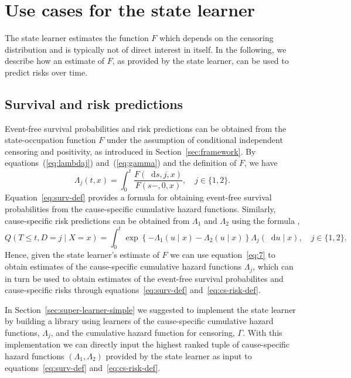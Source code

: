 \documentclass[a4paper,danish]{article}
\theoremstyle{plain} %
\numberwithin{theorem}{section}
\theoremstyle{definition} %
\theoremstyle{remark}
\newcommand*\diff{\mathop{}\!\mathrm{d}}
\newcommand{\1}{\mathds{1}}
\begin{document}
\section{Use cases for the state learner}
\label{sec:use-cases-state}
The state learner estimates the function \( F \) which depends on the
censoring distribution and is typically not of direct interest in
itself. In the following, we describe how an estimate of \( F \), as
provided by the state learner, can be used to predict risks over time.

\subsection{Survival and risk predictions}
\label{sec:surv-risk-pred}

Event-free survival probabilities and risk predictions can be
obtained from the state-occupation function \( F \) under the
assumption of conditional independent censoring and
positivity, as introduced in Section~\ref{sec:framework}. By
equations~(\ref{eq:lambdaj}) and~(\ref{eq:gamma}) and the
definition of \( F \), we have
\begin{equation}
  \label{eq:7}
  \Lambda_j(t , x) 
  = \int_0^t  \frac{F(\diff s, j, x )}{F(s-, 0, x )},
  \quad j \in \{1,2\}.
\end{equation}
Equation~\eqref{eq:surv-def} provides a formula for obtaining
event-free survival probabilities from the cause-specific
cumulative hazard functions. Similarly, cause-specific risk
predictions can be obtained from \( \Lambda_1 \) and
$\Lambda_2$ using the formula
\citep[e.g.,][]{benichou1990estimates,
  ozenne2017riskregression},
\begin{equation}
  \label{eq:cs-risk-def}
  Q(T \leq t, D = j \mid X=x) =
  \int_0^t \exp\left\{-\Lambda_{1}(u \mid x)-\Lambda_{2}(u
    \mid x)\right\}  \Lambda_j(\diff u \mid x),
  \quad j \in \{1,2\}.
\end{equation}
Hence, given the state learner's estimate of \( F \) we can
use equation~\eqref{eq:7} to obtain estimates of the
cause-specific cumulative hazard functions $\Lambda_j$, which
can in turn be used to obtain estimates of the event-free
survival probabilites and cause-specific risks through
equations~\eqref{eq:surv-def} and~\eqref{eq:cs-risk-def}.

In Section~\ref{sec:super-learner-simple} we suggested to
implement the state learner by building a library using
learners of the cause-specific cumulative hazard functions,
$\Lambda_j$, and the cumulative hazard function for censoring,
$\Gamma$. With this implementation we can directly input the
highest ranked tuple of cause-specific hazard functions
$(\Lambda_1, \Lambda_2)$ provided by the state learner as
input to equations~\eqref{eq:surv-def}
and~\eqref{eq:cs-risk-def}.
\end{document}
